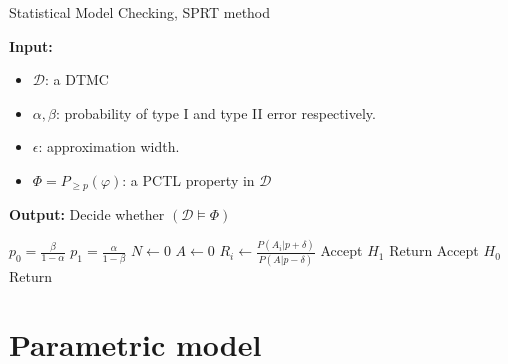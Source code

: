 \begin{algorithm}[H]
    \caption{Statistical Model Checking, SPRT method}
    \label{alg:smc-sprt}
    \hspace*{\algorithmicindent} \textbf{Input:}
    \begin{itemize}
        \item $\mathcal{D}$: a DTMC
        \item $\alpha, \beta$: probability of type I and type II error respectively.
        \item $\epsilon$: approximation width.
        \item $\Phi = P_{\geq p}(\varphi)$: a PCTL property in $\mathcal{D}$
    \end{itemize}
    \hspace*{\algorithmicindent} \textbf{Output:} Decide whether $(\mathcal{D} \models \Phi)$
    \begin{algorithmic}[1]
        \State $p_0 = \frac{\beta}{1 - \alpha}$
        \State $p_1 = \frac{\alpha}{1 - \beta}$
        \State $N \leftarrow 0$
        \State $A \leftarrow 0$
        \State $R_i \leftarrow \frac{P(A_i | p + \delta)}{P(A | p - \delta)}$
        \State Accept $H_1$
        \State Return
        \Else
        \State Accept $H_0$
        \State Return
        \EndIf
        \EndIf
        \EndWhile
        \EndProcedure
    \end{algorithmic}
\end{algorithm}


\section{Parametric model}

